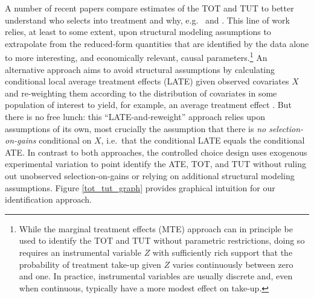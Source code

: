 \documentclass[ecta,nameyear,final]{econsocart}
\begin{document}
A number of recent papers compare estimates of the TOT and TUT to better understand who selects into treatment and why, e.g.\ \cite{cornelissen2018benefits} and \cite{Walters}. 
This line of work relies, at least to some extent, upon structural modeling assumptions to extrapolate from the reduced-form quantities that are identified by the data alone to more interesting, and economically relevant, causal parameters.\footnote{While the marginal treatment effects (MTE) approach \citep{heckman2007econometric} can in principle be used to identify the TOT and TUT without parametric restrictions, doing so requires an instrumental variable $Z$ with sufficiently rich support that the probability of treatment take-up given $Z$ varies continuously between zero and one. In practice, instrumental variables are usually discrete and, even when continuous, typically have a more modest effect on take-up.} 
An alternative approach aims to avoid structural assumptions by calculating conditional local average treatment effects (LATE) given observed covariates $X$ and re-weighting them according to the distribution of covariates in some population of interest to yield, for example, an average treatment effect \citep{aronow2013beyond,angrist2013extrapolate}. 
But there is no free lunch: this ``LATE-and-reweight'' approach relies upon assumptions of its own, most crucially the assumption that there is \emph{no selection-on-gains} conditional on $X$, i.e.\ that the conditional LATE equals the conditional ATE. 
In contrast to both approaches, the controlled choice design uses exogenous experimental variation to point identify the ATE, TOT, and TUT without ruling out unobserved selection-on-gains or relying on additional structural modeling assumptions.
Figure \ref{tot_tut_graph} provides graphical intuition for our identification approach. %
\end{document}

